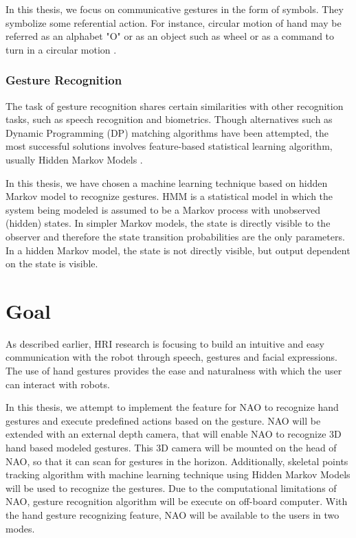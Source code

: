 In this thesis, we focus on communicative gestures in the form of symbols. They symbolize some referential action. For instance, circular motion of hand may be referred as an alphabet "O" or as an object such as wheel or as a command to turn in a circular motion .


\subsection{Gesture Recognition}
The task of gesture recognition shares certain similarities with other recognition tasks, such as speech recognition and biometrics. Though alternatives such as Dynamic Programming (DP) matching algorithms have been attempted, the most successful solutions involves feature-based statistical learning algorithm, usually Hidden Markov Models \cite{5}. 

In this thesis, we have chosen a machine learning technique based on hidden Markov model to recognize gestures. HMM is a statistical model in which the system being modeled is assumed to be a Markov process with unobserved (hidden) states. In simpler Markov models, the state is directly visible to the observer and therefore the state transition probabilities are the only parameters. In a hidden Markov model, the state is not directly visible, but output dependent on the state is visible.


\chapter{Goal} As described earlier, HRI research is focusing to build an intuitive and easy communication with the robot through speech, gestures and facial expressions. The use of hand gestures provides the ease and naturalness with which the user can interact with robots.

In this thesis, we attempt to implement the feature for NAO to recognize hand gestures and execute predefined actions based on the gesture. NAO will be extended with an external depth camera, that will enable NAO to recognize 3D hand based modeled gestures. This 3D camera will be mounted on the head of NAO, so that it can scan for gestures in the horizon.  Additionally, skeletal points tracking algorithm with machine learning technique using Hidden Markov Models will be used to recognize the gestures. Due to the computational limitations of NAO, gesture recognition algorithm will be execute on off-board computer. With the hand gesture recognizing feature, NAO will be available to the users in two modes.

